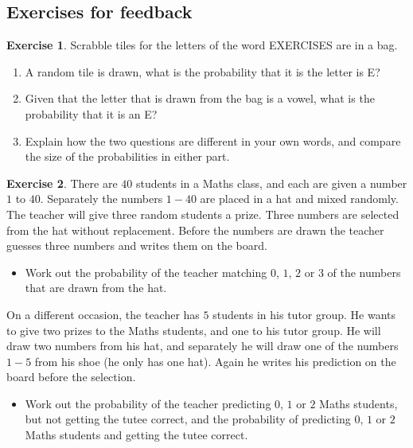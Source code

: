 \documentclass[
]{book}
\providecommand{\tightlist}{%
  \setlength{\itemsep}{0pt}\setlength{\parskip}{0pt}}
\theoremstyle{definition}
\theoremstyle{definition}
\theoremstyle{definition}
\newtheorem{exercise}{Exercise}[chapter]
\theoremstyle{definition}
\theoremstyle{remark}
\begin{document}
\hypertarget{exercises-for-feedback-1}{%
\subsection{Exercises for feedback}\label{exercises-for-feedback-1}}

\begin{exercise}

Scrabble tiles for the letters of the word EXERCISES are in a bag.

\begin{enumerate}
\def\labelenumi{\alph{enumi})}
\item
  A random tile is drawn, what is the probability that it is the letter is E?
\item
  Given that the letter that is drawn from the bag is a vowel, what is the probability that it is an E?
\item
  Explain how the two questions are different in your own words, and compare the size of the probabilities in either part.
\end{enumerate}

\end{exercise}

\begin{exercise}

There are \(40\) students in a Maths class, and each are given a number \(1\) to \(40\). Separately the numbers \(1-40\) are placed in a hat and mixed randomly. The teacher will give three random students a prize. Three numbers are selected from the hat without replacement. Before the numbers are drawn the teacher guesses three numbers and writes them on the board.

\begin{itemize}
\tightlist
\item
  Work out the probability of the teacher matching \(0\), \(1\), \(2\) or \(3\) of the numbers that are drawn from the hat.
\end{itemize}

On a different occasion, the teacher has \(5\) students in his tutor group. He wants to give two prizes to the Maths students, and one to his tutor group. He will draw two numbers from his hat, and separately he will draw one of the numbers \(1-5\) from his shoe (he only has one hat). Again he writes his prediction on the board before the selection.

\begin{itemize}
\tightlist
\item
  Work out the probability of the teacher predicting \(0\), \(1\) or \(2\) Maths students, but not getting the tutee correct, and the probability of predicting \(0\), \(1\) or \(2\) Maths students and getting the tutee correct.
\end{itemize}

\end{exercise}
\end{document}
